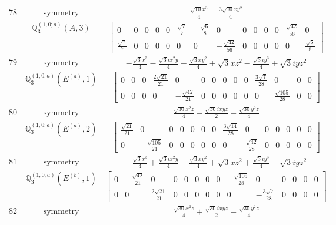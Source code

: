 \documentclass[fleqn,8pt,landscape]{jsarticle}
\begin{document}
\begin{longtable}{ccc}
$ 78 $ & $ \text{symmetry} $ & $ \frac{\sqrt{10} x^{3}}{4} - \frac{3 \sqrt{10} x y^{2}}{4} $ \\
$  $ & $ \mathbb{Q}_{3}^{(1,0;a)}(A,3) $ & $ \begin{bmatrix} 0 & 0 & 0 & 0 & 0 & \frac{\sqrt{7}}{7} & - \frac{\sqrt{6}}{8} & 0 & 0 & 0 & 0 & 0 & \frac{\sqrt{42}}{56} & 0 \\ \frac{\sqrt{7}}{7} & 0 & 0 & 0 & 0 & 0 & 0 & - \frac{\sqrt{42}}{56} & 0 & 0 & 0 & 0 & 0 & \frac{\sqrt{6}}{8} \end{bmatrix} $ \\ \hline
$ 79 $ & $ \text{symmetry} $ & $ - \frac{\sqrt{3} x^{3}}{4} - \frac{\sqrt{3} i x^{2} y}{4} - \frac{\sqrt{3} x y^{2}}{4} + \sqrt{3} x z^{2} - \frac{\sqrt{3} i y^{3}}{4} + \sqrt{3} i y z^{2} $ \\
$  $ & $ \mathbb{Q}_{3}^{(1,0;a)}(E^{(a)},1) $ & $ \begin{bmatrix} 0 & 0 & 0 & \frac{2 \sqrt{21}}{21} & 0 & 0 & 0 & 0 & 0 & 0 & \frac{3 \sqrt{7}}{28} & 0 & 0 & 0 \\ 0 & 0 & 0 & 0 & - \frac{\sqrt{42}}{21} & 0 & 0 & 0 & 0 & 0 & 0 & \frac{\sqrt{105}}{28} & 0 & 0 \end{bmatrix} $ \\ \hline
$ 80 $ & $ \text{symmetry} $ & $ \frac{\sqrt{30} x^{2} z}{4} - \frac{\sqrt{30} i x y z}{2} - \frac{\sqrt{30} y^{2} z}{4} $ \\
$  $ & $ \mathbb{Q}_{3}^{(1,0;a)}(E^{(a)},2) $ & $ \begin{bmatrix} \frac{\sqrt{21}}{21} & 0 & 0 & 0 & 0 & 0 & 0 & \frac{3 \sqrt{14}}{28} & 0 & 0 & 0 & 0 & 0 & 0 \\ 0 & - \frac{\sqrt{105}}{21} & 0 & 0 & 0 & 0 & 0 & 0 & \frac{\sqrt{42}}{28} & 0 & 0 & 0 & 0 & 0 \end{bmatrix} $ \\ \hline
$ 81 $ & $ \text{symmetry} $ & $ - \frac{\sqrt{3} x^{3}}{4} + \frac{\sqrt{3} i x^{2} y}{4} - \frac{\sqrt{3} x y^{2}}{4} + \sqrt{3} x z^{2} + \frac{\sqrt{3} i y^{3}}{4} - \sqrt{3} i y z^{2} $ \\
$  $ & $ \mathbb{Q}_{3}^{(1,0;a)}(E^{(b)},1) $ & $ \begin{bmatrix} 0 & - \frac{\sqrt{42}}{21} & 0 & 0 & 0 & 0 & 0 & 0 & - \frac{\sqrt{105}}{28} & 0 & 0 & 0 & 0 & 0 \\ 0 & 0 & \frac{2 \sqrt{21}}{21} & 0 & 0 & 0 & 0 & 0 & 0 & - \frac{3 \sqrt{7}}{28} & 0 & 0 & 0 & 0 \end{bmatrix} $ \\ \hline
$ 82 $ & $ \text{symmetry} $ & $ \frac{\sqrt{30} x^{2} z}{4} + \frac{\sqrt{30} i x y z}{2} - \frac{\sqrt{30} y^{2} z}{4} $ \\

\end{longtable}
\end{document}

